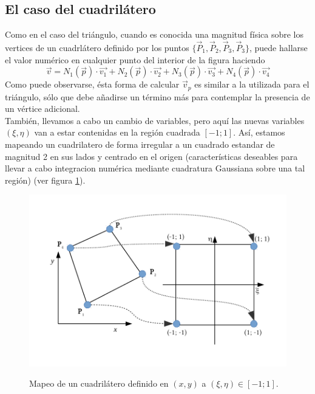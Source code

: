 \subsection{El caso del cuadrilátero}
\label{sec:cuadrilatero}
Como en el caso del triángulo, cuando es conocida una magnitud física sobre los vertices de un cuadrlátero definido por los puntos $ \lbrace \vec{P}_{1}, \vec{P}_{2}, \vec{P}_{3}, \vec{P}_{3}  \rbrace $, puede hallarse el valor numérico en cualquier punto del interior de la figura haciendo
\begin{equation}
\label{eq:combinacionlinealcuaxy}  
  \vec{v} = 
  N_{1}(\vec{p}) \cdot \vec{v_1} + 
  N_{2}(\vec{p}) \cdot \vec{v_2} + 
  N_{3}(\vec{p}) \cdot \vec{v_3} +  
  N_{4}(\vec{p}) \cdot \vec{v_4} 
\end{equation} 
Como puede observarse, ésta forma de calcular $ \vec{v}_{p} $ es similar a la utilizada para el triángulo, sólo que debe añadirse un término más para contemplar la presencia de un vértice adicional.
\\
También, llevamos a cabo un cambio de variables, pero aquí las nuevas variables $(\xi, \eta)$ van a estar contenidas en la región cuadrada $[-1;1]$. Así, estamos mapeando un cuadrilatero de forma irregular a un cuadrado estandar de magnitud 2 en sus lados y centrado en el origen (características deseables para llevar a cabo integracion numérica mediante cuadratura Gaussiana sobre una tal región)  (ver figura \ref{fig:cuad}). 

\begin{figure}
\centering
\includegraphics[scale=.8]{Cuadrilatero.pdf}
\caption{\label{fig:cuad} } Mapeo de un cuadrilátero definido en $(x,y)$ a $(\xi, \eta) \in [-1; 1]$.
\end{figure}

